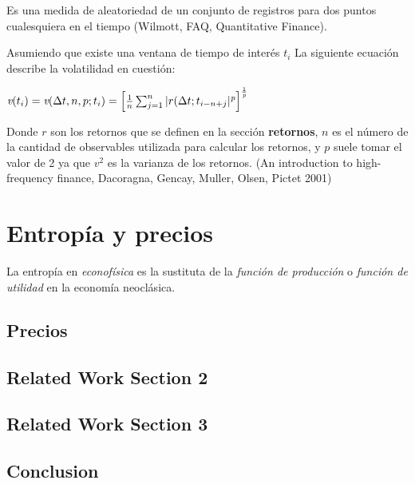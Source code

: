 Es una medida de aleatoriedad de un conjunto de registros para dos puntos cualesquiera en el tiempo (Wilmott, FAQ, Quantitative Finance). 

Asumiendo que existe una ventana de tiempo de interés  $t_{i}$ La siguiente ecuación describe la volatilidad en cuestión:

\begin{center}

$\textit{v}(t_{i}) = \textit{v}(\Delta t, n, p; t_{i}) = \Bigl[ \frac{1}{n} \sum_{j = 1}^{n} |r (\Delta t ; t_{i-n+j}|^{\textit{p}} \Bigr]^\frac{1}{\textit{p}}$

\end{center}

Donde $\textit{r}$ son los retornos que se definen en la sección \textbf{retornos}, $\textit{n}$ es el número de la cantidad de observables utilizada para calcular los retornos, y $\textit{p}$ suele tomar el valor de 2 ya que $\textit{v}^{2}$ es la varianza de los retornos.  (An introduction to high-frequency finance, Dacoragna, Gencay, Muller, Olsen, Pictet 2001)



%
%
%
%
%
\chapter{Entropía y precios}
\label{sec:related}


La entropía en \textit{econofísica} es la sustituta de la \textit{función de producción} o \textit{función de utilidad} en la economía neoclásica. 

\section{ Precios }


\label{sec:precios}

\Blindtext[2][2]

\section{Related Work Section 2}
\label{sec:related:sec2}

\Blindtext[3][2]

\section{Related Work Section 3}
\label{sec:related:sec3}

\Blindtext[4][2]

\section{Conclusion}
\label{sec:related:conclusion}

\Blindtext[2][1]
